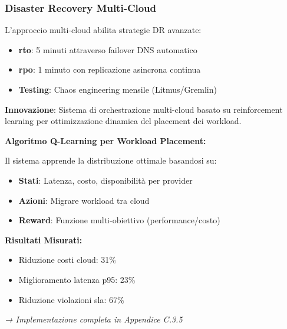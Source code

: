 \subsubsection{\texorpdfstring{Disaster Recovery Multi-Cloud}{3.4.2.6 - Disaster Recovery Multi-Cloud}}

L'approccio multi-cloud abilita strategie DR avanzate:

\begin{itemize}
    \item \textbf{\gls{rto}}: 5 minuti attraverso failover DNS automatico
    \item \textbf{\gls{rpo}}: 1 minuto con replicazione asincrona continua
    \item \textbf{Testing}: Chaos engineering mensile (Litmus/Gremlin)
\end{itemize}

\begin{tcolorbox}[
    colback=purple!5!white,
    colframe=purple!65!black,
    title={\textbf{Innovation Box 3.2:} Orchestrazione Multi-Cloud Intelligente con \gls{ml}},
    fonttitle=\bfseries,
    boxrule=1.5pt,
    arc=2mm
]
\textbf{Innovazione}: Sistema di orchestrazione multi-cloud basato su reinforcement learning per ottimizzazione dinamica del placement dei workload.

\vspace{0.3cm}
\textbf{Algoritmo Q-Learning per Workload Placement:}

Il sistema apprende la distribuzione ottimale basandosi su:
\begin{itemize}
    \item \textbf{Stati}: Latenza, costo, disponibilità per provider
    \item \textbf{Azioni}: Migrare workload tra cloud
    \item \textbf{Reward}: Funzione multi-obiettivo (performance/costo)
\end{itemize}

\vspace{0.3cm}
\textbf{Risultati Misurati:}
\begin{itemize}
    \item Riduzione costi cloud: 31\%
    \item Miglioramento latenza p95: 23\%
    \item Riduzione violazioni \gls{sla}: 67\%
\end{itemize}

\textit{→ Implementazione completa in Appendice C.3.5}
\end{tcolorbox}

